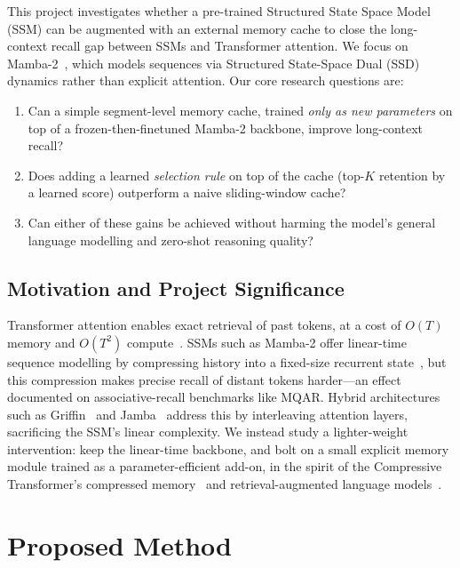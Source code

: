 \documentclass[conference]{IEEEtran}
\begin{document}
This project investigates whether a pre-trained Structured State Space Model (SSM) can be augmented with an external memory cache to close the long-context recall gap between SSMs and Transformer attention. We focus on Mamba-2~\cite{dao2024transformersssmsgeneralizedmodels}, which models sequences via Structured State-Space Dual (SSD) dynamics rather than explicit attention. Our core research questions are:

\begin{enumerate}
    \item Can a simple segment-level memory cache, trained \emph{only as new parameters} on top of a frozen-then-finetuned Mamba-2 backbone, improve long-context recall?
    \item Does adding a learned \emph{selection rule} on top of the cache (top-$K$ retention by a learned score) outperform a naive sliding-window cache?
    \item Can either of these gains be achieved without harming the model's general language modelling and zero-shot reasoning quality?
\end{enumerate}

\subsection{Motivation and Project Significance}

Transformer attention enables exact retrieval of past tokens, at a cost of $O(T)$ memory and $O(T^2)$ compute~\cite{tay2022efficienttransformerssurvey,fichtl2025endtransformerschallengingattention}. SSMs such as Mamba-2 offer linear-time sequence modelling by compressing history into a fixed-size recurrent state~\cite{dao2024transformersssmsgeneralizedmodels}, but this compression makes precise recall of distant tokens harder---an effect documented on associative-recall benchmarks like MQAR. Hybrid architectures such as Griffin~\cite{de2024griffinmixinggatedlinear} and Jamba~\cite{lieber2024jambahybridtransformermambalanguage} address this by interleaving attention layers, sacrificing the SSM's linear complexity. We instead study a lighter-weight intervention: keep the linear-time backbone, and bolt on a small explicit memory module trained as a parameter-efficient add-on, in the spirit of the Compressive Transformer's compressed memory~\cite{rae2019compressivetransformerslongrangesequence} and retrieval-augmented language models~\cite{lewis2021retrievalaugmentedgenerationknowledgeintensivenlp}.

\section{Proposed Method}
\end{document}
